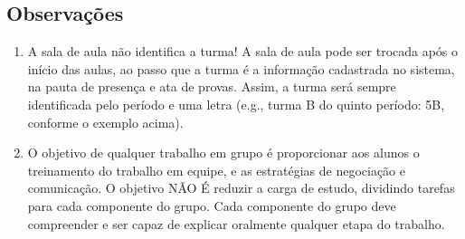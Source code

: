 \documentclass[a4paper]{article}
\begin{document}
\subsection{Observações}

\begin{enumerate}
\item A sala de aula não identifica a turma! A sala de aula pode ser
  trocada após o início das aulas, ao passo que a turma é a informação
  cadastrada no sistema, na pauta de presença e ata de provas. Assim,
  a turma será sempre identificada pelo período e uma letra (e.g.,
  turma B do quinto período: 5B, conforme o exemplo acima).
\item O objetivo de qualquer trabalho em grupo é proporcionar aos
  alunos o treinamento do trabalho em equipe, e as estratégias de
  negociação e comunicação. O objetivo NÃO É reduzir a carga de
  estudo, dividindo tarefas para cada componente do grupo. Cada
  componente do grupo deve compreender e ser capaz de explicar
  oralmente qualquer etapa do trabalho.

\end{enumerate}

 
\end{document}
